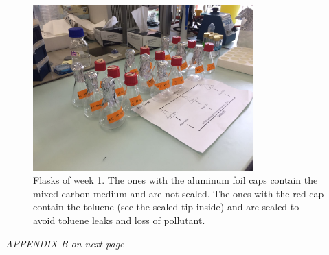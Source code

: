 \documentclass[a4paper, 10pt, conference]{ieeeconf}   %
\begin{document}
\begin{figure}[H]


	\includegraphics[width=8.5cm]{flasks.jpg}
	\caption{Flasks of week 1. The ones with the aluminum foil caps contain the mixed carbon medium and are not sealed. The ones with the red cap contain the toluene (see the sealed tip inside) and are sealed to avoid toluene leaks and loss of pollutant.}
	\label{flasks}
\end{figure}
\vspace*{\fill}
\textit{APPENDIX B on next page}
\clearpage
{}
\end{document}
